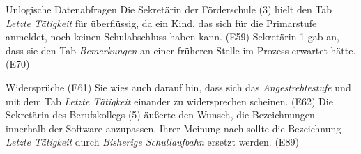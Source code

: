 Unlogische Datenabfragen
Die Sekretärin der Förderschule (3) hielt den Tab \textit{Letzte Tätigkeit} für überflüssig, da ein Kind, das sich für die Primarstufe anmeldet, noch keinen Schulabschluss haben kann. (E59) 
Sekretärin 1 gab an, dass sie den Tab \textit{Bemerkungen} an einer früheren Stelle im Prozess erwartet hätte. (E70)



Widersprüche 
(E61) Sie wies auch darauf hin, dass sich das \textit{Angestrebtestufe} und mit dem Tab \textit{Letzte Tätigkeit} einander zu widersprechen scheinen. (E62)
Die Sekretärin des Berufskollegs (5) äußerte den Wunsch, die Bezeichnungen innerhalb der Software anzupassen. Ihrer Meinung nach sollte die Bezeichnung \textit{Letzte Tätigkeit} durch \textit{Bisherige Schullaufbahn} ersetzt werden. (E89)
